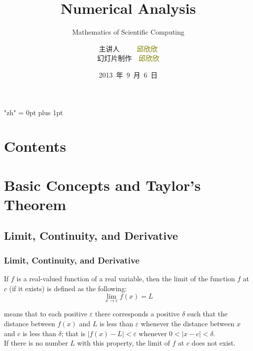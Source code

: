 \documentclass[notheorems,mathserif,table,compress]{beamer}  %
\begin{document}
\XeTeXlinebreaklocale "zh"         %
\XeTeXlinebreakskip = 0pt plus 1pt %


\title[Numerical Analysis]{Numerical Analysis}
\subtitle{Mathematics of Scientific Computing}
\author[qiu]{主讲人~~~~~\textcolor{olive}{邱欣欣}\\
    \quad 幻灯片制作~~\textcolor{olive}{邱欣欣}}
\institute[中国海洋大学]{\small\textcolor{violet}{中国海洋大学~~信息科学与工程学院}}
\date{2013~年~9~月~6~日}
\frame{ \titlepage }
\section*{Contents}
\section{Basic Concepts and Taylor's Theorem}

\subsection{Limit, Continuity, and Derivative} 

\begin{frame}
\frametitle{Limit, Continuity, and Derivative}
If $f$ is a real-valued function of a real variable, then the limit of the function $f$ at $c$ (if it exists) is defined as the following:
\begin{displaymath}
\lim_{x \to c}f(x)=L
\end{displaymath}

means that to each positive $\varepsilon$ there corresponds a positive $\delta$ such that the distance between $f(x)$ and $L$ is less than $\varepsilon$ whenever the distance between $x$ and $c$ is less than $\delta$; that is $|f(x)−L|<\varepsilon$ whenever $0<|x−c|<\delta$.
\\If there is no number $L$ with this property, the limit of $f$ at $c$ does not exist.
\end{frame}
\end{document}
